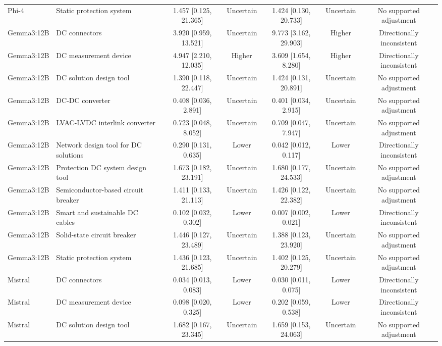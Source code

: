 \begin{landscape}
\begin{longtable}{llccccc}
Phi-4 & Static protection system & 1.457 [0.125, 21.365] & Uncertain & 1.424 [0.130, 20.733] & Uncertain & No supported adjustment \\
Gemma3:12B & DC connectors & 3.920 [0.959, 13.521] & Uncertain & 9.773 [3.162, 29.903] & Higher & Directionally inconsistent \\
Gemma3:12B & DC measurement device & 4.947 [2.210, 12.035] & Higher & 3.609 [1.654, 8.280] & Higher & Directionally inconsistent \\
Gemma3:12B & DC solution design tool & 1.390 [0.118, 22.447] & Uncertain & 1.424 [0.131, 20.891] & Uncertain & No supported adjustment \\
Gemma3:12B & DC-DC converter & 0.408 [0.036, 2.891] & Uncertain & 0.401 [0.034, 2.915] & Uncertain & No supported adjustment \\
Gemma3:12B & LVAC-LVDC interlink converter & 0.723 [0.048, 8.052] & Uncertain & 0.709 [0.047, 7.947] & Uncertain & No supported adjustment \\
Gemma3:12B & Network design tool for DC solutions & 0.290 [0.131, 0.635] & Lower & 0.042 [0.012, 0.117] & Lower & Directionally inconsistent \\
Gemma3:12B & Protection DC system design tool & 1.673 [0.182, 23.191] & Uncertain & 1.680 [0.177, 24.533] & Uncertain & No supported adjustment \\
Gemma3:12B & Semiconductor-based circuit breaker & 1.411 [0.133, 21.113] & Uncertain & 1.426 [0.122, 22.382] & Uncertain & No supported adjustment \\
Gemma3:12B & Smart and sustainable DC cables & 0.102 [0.032, 0.302] & Lower & 0.007 [0.002, 0.021] & Lower & Directionally inconsistent \\
Gemma3:12B & Solid-state circuit breaker & 1.446 [0.127, 23.489] & Uncertain & 1.388 [0.123, 23.920] & Uncertain & No supported adjustment \\
Gemma3:12B & Static protection system & 1.436 [0.123, 21.685] & Uncertain & 1.402 [0.125, 20.279] & Uncertain & No supported adjustment \\
Mistral & DC connectors & 0.034 [0.013, 0.083] & Lower & 0.030 [0.011, 0.075] & Lower & Directionally inconsistent \\
Mistral & DC measurement device & 0.098 [0.020, 0.325] & Lower & 0.202 [0.059, 0.538] & Lower & Directionally inconsistent \\
Mistral & DC solution design tool & 1.682 [0.167, 23.345] & Uncertain & 1.659 [0.153, 24.063] & Uncertain & No supported adjustment \\

\end{longtable}
\end{landscape}
